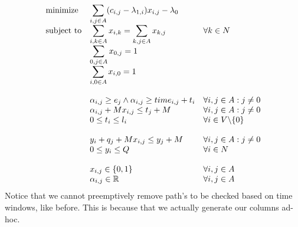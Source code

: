 \documentclass{article}
\begin{document}
    \begin{equation*}
        \begin{array}{ll@{}ll}
            \text{minimize}  & \displaystyle\sum_{i,j \in A} ( c_{i, j} - \lambda_{1,i})x_{i,j} - \lambda_0&&\\
            \text{subject to}& \displaystyle\sum_{i, k \in A}x_{i,k} = \sum_{k, j \in A}x_{k,j} &&\forall k \in N\\
            & \displaystyle\sum_{0,j \in A}x_{0,j} = 1 &&\\
            & \displaystyle\sum_{i,0 \in A}x_{i,0} = 1 &&\\\\
            & \displaystyle\alpha_{i,j} \geq e_j \land \alpha_{i,j} \geq time_{i,j} + t_i &&  \forall i,j \in A: j \neq 0\\
            & \displaystyle \alpha_{i,j} + Mx_{i,j} \leq t_j + M  && \forall i,j \in A: j \neq 0\\
            & \displaystyle0 \leq t_i \leq l_i &&  \forall i \in V \backslash \{ 0 \}\\\\
            & \displaystyle y_i + q_j + M x_{i,j} \leq y_j + M & & \forall i,j \in A : j \neq 0\\
            & \displaystyle 0 \leq y_i \leq Q && \forall i \in N \\\\
            & \displaystyle x_{i,j} \in \{0,1\} && \forall i,j \in A\\
            & \displaystyle \alpha_{i,j} \in \mathbb{R} && \forall i,j \in A
        \end{array}
    \end{equation*}
    Notice that we cannot preemptively remove path's to be checked based on time windows, like before.
    This is because that we actually generate our columns ad-hoc.
\end{document}
